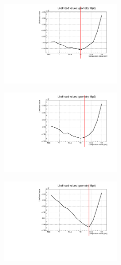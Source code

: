 \documentclass[a4paper, 11pt, twoside, openright]{report}
\begin{document}
\begin{figure}[htbp]
\begin{minipage}[b]{.32\textwidth}
\includegraphics[width=6cm, height=4.6cm]{figs/likelihood250LowStat/likelihood18p0.pdf}
\end{minipage}\hfill
\begin{minipage}[b]{.32\textwidth}
\includegraphics[width=6cm, height=4.6cm]{figs/likelihood250LowStat/likelihood18p2.pdf}
\end{minipage} \hfill
\begin{minipage}[b]{.32\textwidth}
\includegraphics[width=6cm, height=4.6cm]{figs/likelihood250LowStat/likelihood18p4.pdf}
\end{minipage} \hfill \vspace{10pt}


\end{figure}
\end{document}
